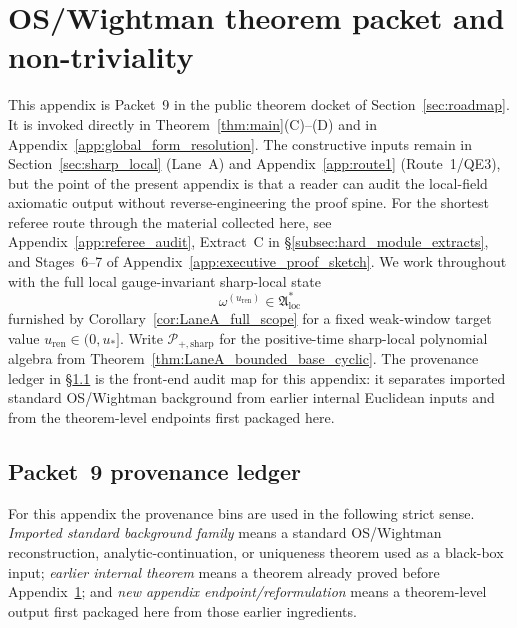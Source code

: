 \section{OS/Wightman theorem packet and non-triviality}
\label{app:axioms_package}

This appendix is Packet~9 in the public theorem docket of Section~\ref{sec:roadmap}.
It is invoked directly in Theorem~\ref{thm:main}(C)--(D) and in Appendix~\ref{app:global_form_resolution}.
The constructive inputs remain in Section~\ref{sec:sharp_local} (Lane~A) and Appendix~\ref{app:route1} (Route~1/QE3),
but the point of the present appendix is that a reader can audit the local-field axiomatic output without reverse-engineering the proof spine.
For the shortest referee route through the material collected here, see Appendix~\ref{app:referee_audit}, Extract~C in \S\ref{subsec:hard_module_extracts}, and Stages~6--7 of Appendix~\ref{app:executive_proof_sketch}.
We work throughout with the full local gauge-invariant sharp-local state
\[
\omega^{(u_{\mathrm{ren}})}\in \mathfrak A_{\mathrm{loc}}^*
\]
furnished by Corollary~\ref{cor:LaneA_full_scope} for a fixed weak-window target value $u_{\mathrm{ren}}\in(0,u_\ast]$.
Write $\mathcal P_{+,\mathrm{sharp}}$ for the positive-time sharp-local polynomial algebra from Theorem~\ref{thm:LaneA_bounded_base_cyclic}.
The provenance ledger in \S\ref{subsec:packet9_provenance_ledger} is the front-end audit map for this appendix: it separates imported standard OS/Wightman background from earlier internal Euclidean inputs and from the theorem-level endpoints first packaged here.

\subsection{Packet~9 provenance ledger}
\label{subsec:packet9_provenance_ledger}

For this appendix the provenance bins are used in the following strict sense.
\emph{Imported standard background family} means a standard OS/Wightman reconstruction, analytic-continuation, or uniqueness theorem used as a black-box input;
\emph{earlier internal theorem} means a theorem already proved before Appendix~\ref{app:axioms_package};
and \emph{new appendix endpoint/reformulation} means a theorem-level output first packaged here from those earlier ingredients.


